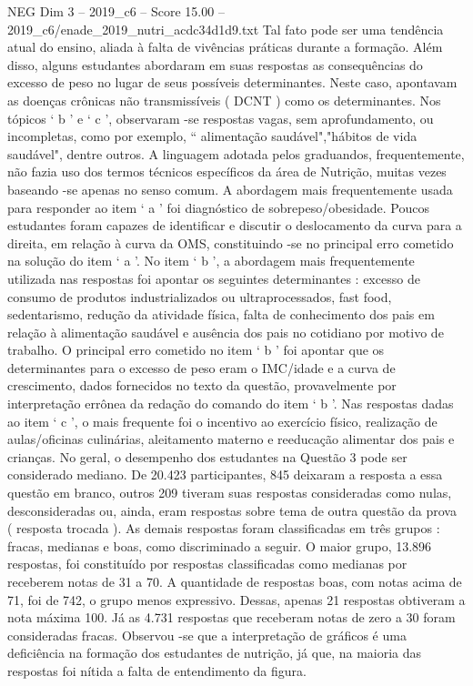 \begin{textsample}{NEG Dim 3 – 2019\_c6 – Score 15.00 – 2019\_c6/enade\_2019\_nutri\_acdc34d1d9.txt}
Tal fato pode ser uma tendência atual do ensino, aliada à falta de vivências práticas durante a formação.
Além disso, alguns estudantes abordaram em suas respostas as consequências do excesso de peso no lugar de seus possíveis determinantes.
Neste caso, apontavam as doenças crônicas não transmissíveis ( DCNT ) como os determinantes.
Nos tópicos ‘ b ’ e ‘ c ’, observaram -se respostas vagas, sem aprofundamento, ou incompletas, como por exemplo, “ alimentação saudável","hábitos de vida saudável", dentre outros.
A linguagem adotada pelos graduandos, frequentemente, não fazia uso dos termos técnicos específicos da área de Nutrição, muitas vezes baseando -se apenas no senso comum.
A abordagem mais frequentemente usada para responder ao item ‘ a ’ foi diagnóstico de sobrepeso/obesidade.
Poucos estudantes foram capazes de identificar e discutir o deslocamento da curva para a direita, em relação à curva da OMS, constituindo -se no principal erro cometido na solução do item ‘ a ’.
No item ‘ b ’, a abordagem mais frequentemente utilizada nas respostas foi apontar os seguintes determinantes : excesso de consumo de produtos industrializados ou ultraprocessados, fast food, sedentarismo, redução da atividade física, falta de conhecimento dos pais em relação à alimentação saudável e ausência dos pais no cotidiano por motivo de trabalho.
O principal erro cometido no item ‘ b ’ foi apontar que os determinantes para o excesso de peso eram o IMC/idade e a curva de crescimento, dados fornecidos no texto da questão, provavelmente por interpretação errônea da redação do comando do item ‘ b ’.
Nas respostas dadas ao item ‘ c ’, o mais frequente foi o incentivo ao exercício físico, realização de aulas/oficinas culinárias, aleitamento materno e reeducação alimentar dos pais e crianças.
No geral, o desempenho dos estudantes na Questão 3 pode ser considerado mediano.
De 20.423 participantes, 845 deixaram a resposta a essa questão em branco, outros 209 tiveram suas respostas consideradas como nulas, desconsideradas ou, ainda, eram respostas sobre tema de outra questão da prova ( resposta trocada ).
As demais respostas foram classificadas em três grupos : fracas, medianas e boas, como discriminado a seguir.
O maior grupo, 13.896 respostas, foi constituído por respostas classificadas como medianas por receberem notas de 31 a 70.
A quantidade de respostas boas, com notas acima de 71, foi de 742, o grupo menos expressivo.
Dessas, apenas 21 respostas obtiveram a nota máxima 100.
Já as 4.731 respostas que receberam notas de zero a 30 foram consideradas fracas.
Observou -se que a interpretação de gráficos é uma deficiência na formação dos estudantes de nutrição, já que, na maioria das respostas foi nítida a falta de entendimento da figura.

\end{textsample}
